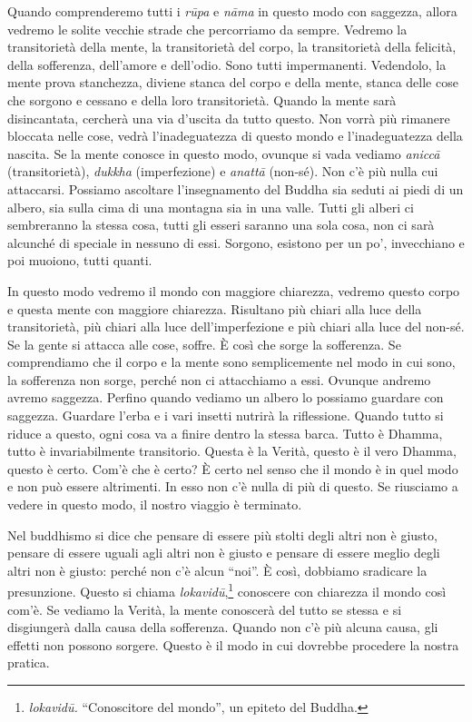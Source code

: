 Quando comprenderemo tutti i \emph{rūpa} e \emph{nāma} in questo modo
con saggezza, allora vedremo le solite vecchie strade che percorriamo da
sempre. Vedremo la transitorietà della mente, la transitorietà del
corpo, la transitorietà della felicità, della sofferenza, dell'amore e
dell'odio. Sono tutti impermanenti. Vedendolo, la mente prova
stanchezza, diviene stanca del corpo e della mente, stanca delle cose
che sorgono e cessano e della loro transitorietà. Quando la mente sarà
disincantata, cercherà una via d'uscita da tutto questo. Non vorrà più
rimanere bloccata nelle cose, vedrà l'inadeguatezza di questo mondo e
l'inadeguatezza della nascita. Se la mente conosce in questo modo,
ovunque si vada vediamo \emph{aniccā} (transitorietà), \emph{dukkha}
(imperfezione) e \emph{anattā} (non-sé). Non c'è più nulla cui
attaccarsi. Possiamo ascoltare l'insegnamento del Buddha sia seduti ai
piedi di un albero, sia sulla cima di una montagna sia in una valle.
Tutti gli alberi ci sembreranno la stessa cosa, tutti gli esseri saranno
una sola cosa, non ci sarà alcunché di speciale in nessuno di essi.
Sorgono, esistono per un po', invecchiano e poi muoiono, tutti quanti.

In questo modo vedremo il mondo con maggiore chiarezza, vedremo questo
corpo e questa mente con maggiore chiarezza. Risultano più chiari alla
luce della transitorietà, più chiari alla luce dell'imperfezione e più
chiari alla luce del non-sé. Se la gente si attacca alle cose, soffre. È
così che sorge la sofferenza. Se comprendiamo che il corpo e la mente
sono semplicemente nel modo in cui sono, la sofferenza non sorge, perché
non ci attacchiamo a essi. Ovunque andremo avremo saggezza. Perfino
quando vediamo un albero lo possiamo guardare con saggezza. Guardare
l'erba e i vari insetti nutrirà la riflessione. Quando tutto si riduce a
questo, ogni cosa va a finire dentro la stessa barca. Tutto è Dhamma,
tutto è invariabilmente transitorio. Questa è la Verità, questo è il
vero Dhamma, questo è certo. Com'è che è certo? È certo nel senso che il
mondo è in quel modo e non può essere altrimenti. In esso non c'è nulla
di più di questo. Se riusciamo a vedere in questo modo, il nostro
viaggio è terminato.

Nel buddhismo si dice che pensare di essere più stolti degli altri non è
giusto, pensare di essere uguali agli altri non è giusto e pensare di
essere meglio degli altri non è giusto: perché non c'è alcun ``noi''. È
così, dobbiamo sradicare la presunzione. Questo si chiama
\emph{lokavidū},\footnote{\emph{lokavidū.} ``Conoscitore del mondo'', un
  epiteto del Buddha.} conoscere con chiarezza il mondo così com'è. Se
vediamo la Verità, la mente conoscerà del tutto se stessa e si
disgiungerà dalla causa della sofferenza. Quando non c'è più alcuna
causa, gli effetti non possono sorgere. Questo è il modo in cui dovrebbe
procedere la nostra pratica.

